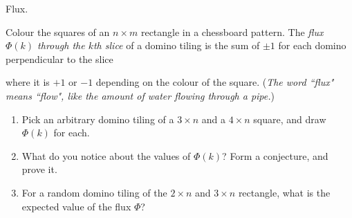 \documentclass[11pt,fleqn]{book} %
\begin{document}
\begin{problem}
  Flux.  
          \begin{center}
        \end{center}
    Colour the squares of an $n\times m$ rectangle in a chessboard pattern. The \textit{flux $\Phi(k)$ through the $k$th slice} of a domino tiling is the sum of $\pm 1$ for each domino perpendicular to the slice
    
          \begin{center}
        \end{center}
where it is $+1$ or $-1$ depending on the colour of the square. (\textit{The word ``flux"\text{ } means ``flow", like the  amount of water flowing through a pipe.})
\begin{enumerate}[label = \alph*.]
 \item Pick an arbitrary domino tiling of a $3\times n$ and a $4\times n$ square, and draw $\Phi(k)$ for each.
 \item What do you notice about the values of $\Phi(k)$? Form a conjecture, and prove it.
 \item For a random domino tiling of the $2\times n$ and $3\times n$ rectangle, what is the expected value of the flux $\Phi$?
\end{enumerate}
\end{problem}
\end{document}

